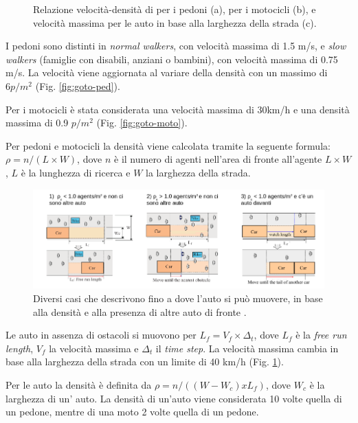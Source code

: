\begin{figure}[ht]
\begin{subfigure}{0.32\textwidth}
        \caption{}
        \label{fig:goto-auto}
    \end{subfigure}
    \caption{Relazione velocità-densità di \textcite{goto2012tsunami} per i pedoni (a), per i motocicli (b), e velocità massima per le auto in base alla larghezza della strada (c).}
    \label{fig:ankdasndk}
\end{figure}

I pedoni sono distinti in \textit{normal walkers}, con velocità massima di 1.5 m/s, e
\textit{slow walkers} (famiglie con disabili, anziani o bambini), con velocità massima di 0.75 m/s.
%
La velocità viene aggiornata al variare della densità con un massimo di $6 p/m^2$ (Fig. \ref{fig:goto-ped}).

Per i motocicli è stata considerata una velocità massima di 30km/h e una densità massima di 0.9 $p/m^2$ (Fig. \ref{fig:goto-moto}).

Per pedoni e motocicli la densità viene calcolata tramite la seguente formula:
$\rho = n /(L \times W)$, dove $n$ è il numero di agenti nell'area di fronte all'agente $L \times W$, $L$ è la lunghezza di ricerca 
e $W$ la larghezza della strada.

\begin{figure}[ht]
    \centering
    \includegraphics[width=\textwidth]{images/goto_car.png}
    \caption{Diversi casi che descrivono fino a dove l'auto si può muovere, in base alla densità e alla presenza di altre auto di fronte \parencite{goto2012tsunami}.}
    \label{fig:goto-car-model}
\end{figure}

Le auto in assenza di ostacoli si muovono per $L_{f} = V_{f} \times \Delta_{t} $, dove $L_{f}$ è la \textit{free run length},
$V_{f}$ la velocità massima e $\Delta_{t}$ il \textit{time step}.
La velocità massima cambia in base alla larghezza della strada con un limite di 40 km/h (Fig. \ref{fig:goto-auto}).

Per le auto la densità è definita da $\rho = n /((W - W_{c}) x L_{f})$, dove $W_{c}$ è la larghezza di un' auto.
La densità di un'auto viene considerata 10 volte quella di un pedone, mentre di una moto 2 volte quella di un pedone.

